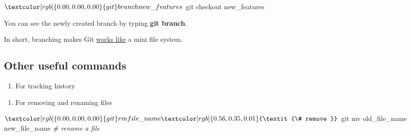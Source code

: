 \documentclass[
]{book}
\newenvironment{Shaded}{\begin{snugshade}}{\end{snugshade}}
\newcommand{\CommentTok}[1]{\textcolor[rgb]{0.56,0.35,0.01}{\textit{#1}}}
\newcommand{\FunctionTok}[1]{\textcolor[rgb]{0.00,0.00,0.00}{#1}}
\newcommand{\NormalTok}[1]{#1}
\newcommand{\OperatorTok}[1]{\textcolor[rgb]{0.81,0.36,0.00}{\textbf{#1}}}
\providecommand{\tightlist}{%
  \setlength{\itemsep}{0pt}\setlength{\parskip}{0pt}}
\begin{document}
\begin{Shaded}
\begin{Highlighting}[]
\NormalTok{$ }\FunctionTok{git}\NormalTok{ branch new\_features}
\NormalTok{$ }\FunctionTok{git}\NormalTok{ checkout new\_features}
\end{Highlighting}
\end{Shaded}

You can see the newly created branch by typing \textbf{git branch}.

In short, branching makes Git \href{https://git-scm.com/book/en/v2/Getting-Started-Git-Basics}{works like} a mini file system.

\hypertarget{other-useful-commands}{%
\subsection{Other useful commands}\label{other-useful-commands}}

\begin{enumerate}
\def\labelenumi{\arabic{enumi}.}
\tightlist
\item
  For tracking history
\end{enumerate}

\begin{Shaded}
\end{Shaded}

\begin{enumerate}
\def\labelenumi{\arabic{enumi}.}
\setcounter{enumi}{1}
\tightlist
\item
  For removing and renaming files
\end{enumerate}

\begin{Shaded}
\begin{Highlighting}[]
\NormalTok{$ }\FunctionTok{git}\NormalTok{ rm file\_name }\CommentTok{\# remove }
\NormalTok{$ }\FunctionTok{git}\NormalTok{ mv old\_file\_name new\_file\_name }\CommentTok{\# rename a file }
\end{Highlighting}
\end{Shaded}
\end{document}
